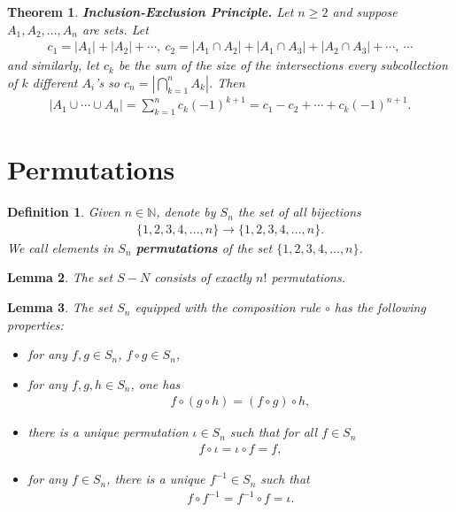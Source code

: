 \documentclass{article}
\theoremstyle{sltheorem}
\newtheorem{definition}{Definition}[section]
\newtheorem{theorem}{Theorem}[section]
\newtheorem{lemma}[theorem]{Lemma}
\newcommand{\N}{\mathbb{N}}
\begin{document}
\begin{theorem}
    \textbf{Inclusion-Exclusion Principle.} Let $n\geq 2$ and suppose $A_1, A_2, ..., A_n$ are sets. Let
    \begin{align*}
        c_1=|A_1|+|A_2|+\cdots,\:c_2=|A_1\cap A_2|+|A_1\cap A_3|+|A_2\cap A_3|+\cdots,\:\cdots
    \end{align*}
    and similarly, let $c_k$ be the sum of the size of the intersections every subcollection of $k$ different $A_i$'s so $c_n=|\bigcap_{k=1}^n A_k|$. Then
    \begin{align*}
        |A_1\cup \cdots \cup A_n| = \sum_{k=1}^n c_k (-1)^{k+1}=c_1-c_2+\cdots +c_k (-1)^{n+1}.
    \end{align*}
\end{theorem}
\section{Permutations}
\begin{definition}
    Given $n\in\N$, denote by $S_n$ the set of all bijections
    \begin{align*}
        \{1,2,3,4,...,n\}\to\{1,2,3,4,...,n\}.
    \end{align*}
    We call elements in $S_n$ \textbf{permutations} of the set $\{1,2,3,4,...,n\}$.
\end{definition}
\begin{lemma}
    The set $S-N$ consists of exactly $n!$ permutations.
\end{lemma}
\begin{lemma}
    The set $S_n$ equipped with the composition rule $\circ$ has the following properties:
    \begin{itemize}
        \item for any $f,g\in S_n$, $f\circ g\in S_n$,
        \item for any $f,g,h\in S_n$, one has
        \begin{align*}
            f\circ \left(g\circ h\right)=\left(f\circ g\right)\circ h,
        \end{align*}
        \item there is a unique permutation $\iota \in S_n$ such that for all $f\in S_n$
        \begin{align*}
            f\circ \iota = \iota \circ f = f,
        \end{align*}
        \item for any $f\in S_n$, there is a unique $f^{-1}\in S_n$ such that
        \begin{align*}
            f\circ f^{-1}=f^{-1}\circ f = \iota.
        \end{align*}
    \end{itemize}
\end{lemma}
\end{document}
